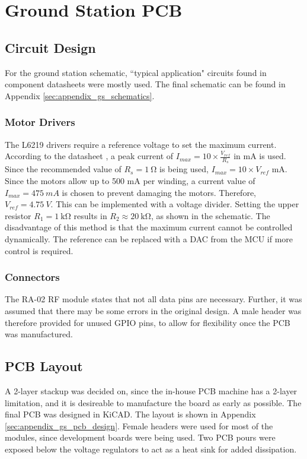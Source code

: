 \graphicspath{{./figures}}

\section{Ground Station PCB}
\subsection{Circuit Design}
For the ground station schematic, ``typical application" circuits found in component datasheets were mostly used. The final schematic can be found in Appendix \ref{sec:appendix_gs_schematics}.

\subsubsection{Motor Drivers}
The L6219 drivers require a reference voltage to set the maximum current. According to the datasheet \cite{datasheet-L6219}, a peak current of $I_{max} = 10 \times \frac{V_{ref}}{R_s}$ in mA is used. Since the recommended value of $R_s = \SI{1}{\ohm}$ is being used, $I_{max} = 10 \times V_{ref}$ mA. Since the motors allow up to 500 mA per winding, a current value of $I_{max} = \SI{475}{mA}$ is chosen to prevent damaging the motors. Therefore, $V_{ref} = \SI{4.75}{V}$. This can be implemented with a voltage divider. Setting the upper resistor $R_1 = \SI{1}{\kilo \ohm}$ results in $R_2 \approx \SI{20}{\kilo \ohm}$, as shown in the schematic. The disadvantage of this method is that the maximum current cannot be controlled dynamically. The reference can be replaced with a DAC from the MCU if more control is required.

\subsubsection{Connectors}
The RA-02 RF module states that not all data pins are necessary. Further, it was assumed that there may be some errors in the original design. A male header was therefore provided for unused GPIO pins, to allow for flexibility once the PCB was manufactured.

\subsection{PCB Layout}
A 2-layer stackup was decided on, since the in-house PCB machine has a 2-layer limitation, and it is desireable to manufacture the board as early as possible. The final PCB was designed in KiCAD. The layout is shown in Appendix \ref{sec:appendix_gs_pcb_design}. Female headers were used for most of the modules, since development boards were being used. Two PCB pours were exposed below the voltage regulators to act as a heat sink for added dissipation.